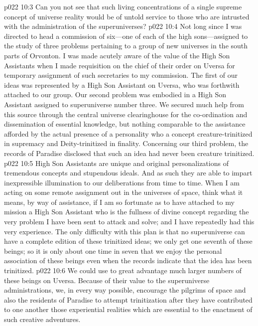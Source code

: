\vs p022 10:3 Can you not see that such living concentrations of a single supreme concept of universe reality would be of untold service to those who are intrusted with the administration of the superuniverses?
\pc \vs p022 10:4 Not long since I was directed to head a commission of six---one of each of the high sons---assigned to the study of three problems pertaining to a group of new universes in the south parts of Orvonton. I was made acutely aware of the value of the High Son Assistants when I made requisition on the chief of their order on Uversa for temporary assignment of such secretaries to my commission. The first of our ideas was represented by a High Son Assistant on Uversa, who was forthwith attached to our group. Our second problem was embodied in a High Son Assistant assigned to superuniverse number three. We secured much help from this source through the central universe clearinghouse for the co\hyp{}ordination and dissemination of essential knowledge, but nothing comparable to the assistance afforded by the actual presence of a personality who  a concept creature\hyp{}trinitized in supremacy and Deity\hyp{}trinitized in finality. Concerning our third problem, the records of Paradise disclosed that such an idea had never been creature trinitized.
\pc \vs p022 10:5 High Son Assistants are unique and original personalizations of tremendous concepts and stupendous ideals. And as such they are able to impart inexpressible illumination to our deliberations from time to time. When I am acting on some remote assignment out in the universes of space, think what it means, by way of assistance, if I am so fortunate as to have attached to my mission a High Son Assistant who is the fullness of divine concept regarding the very problem I have been sent to attack and solve; and I have repeatedly had this very experience. The only difficulty with this plan is that no superuniverse can have a complete edition of these trinitized ideas; we only get one seventh of these beings; so it is only about one time in seven that we enjoy the personal association of these beings even when the records indicate that the idea has been trinitized.
\vs p022 10:6 We could use to great advantage much larger numbers of these beings on Uversa. Because of their value to the superuniverse administrations, we, in every way possible, encourage the pilgrims of space and also the residents of Paradise to attempt trinitization after they have contributed to one another those experiential realities which are essential to the enactment of such creative adventures.\plusone
